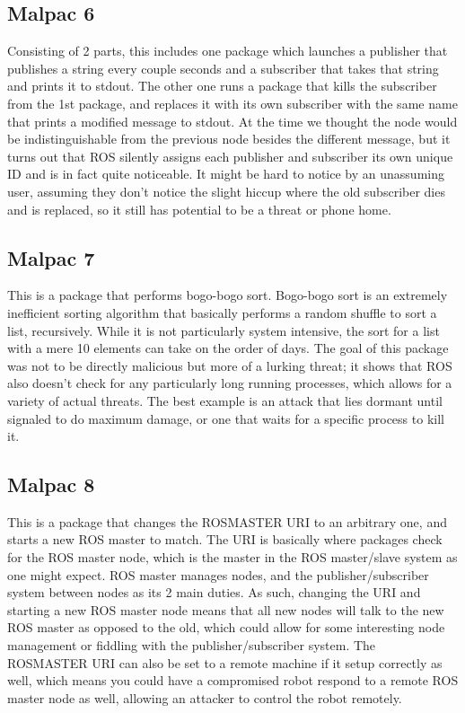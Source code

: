 \documentclass[IEEEtran,letterpaper,10pt,notitlepage,draftclsnofoot,onecolumn]{article}
\begin{document}
\subsection{Malpac 6}
Consisting of 2 parts, this includes one package which launches a publisher that publishes a string every couple seconds and a subscriber that takes that string and prints it to stdout. 
The other one runs a package that kills the subscriber from the 1st package, and replaces it with its own subscriber with the same name that prints a modified message to stdout. 
At the time we thought the node would be indistinguishable from the previous node besides the different message, but it turns out that ROS silently assigns each publisher and subscriber its own unique ID and is in fact quite noticeable. 
It might be hard to notice by an unassuming user, assuming they don’t notice the slight hiccup where the old subscriber dies and is replaced, so it still has potential to be a threat or phone home.

\subsection{Malpac 7}
This is a package that performs bogo-bogo sort. \cite{bogo}
Bogo-bogo sort is an extremely inefficient sorting algorithm that basically performs a random shuffle to sort a list, recursively. 
While it is not particularly system intensive, the sort for a list with a mere 10 elements can take on the order of days. 
The goal of this package was not to be directly malicious but more of a lurking threat; it shows that ROS also doesn’t check for any particularly long running processes, which allows for a variety of actual threats. 
The best example is an attack that lies dormant until signaled to do maximum damage, or one that waits for a specific process to kill it. 

\subsection{Malpac 8}
This is a package that changes the ROSMASTER URI to an arbitrary one, and starts a new ROS master to match. 
The URI is basically where packages check for the ROS master node, which is the master in the ROS master/slave system as one might expect. 
ROS master manages nodes, and the publisher/subscriber system between nodes as its 2 main duties. 
As such, changing the URI and starting a new ROS master node means that all new nodes will talk to the new ROS master as opposed to the old, which could allow for some interesting node management or fiddling with the publisher/subscriber system. 
The ROSMASTER URI can also be set to a remote machine if it setup correctly as well, which means you could have a compromised robot respond to a remote ROS master node as well, allowing an attacker to control the robot remotely. 
\end{document}
